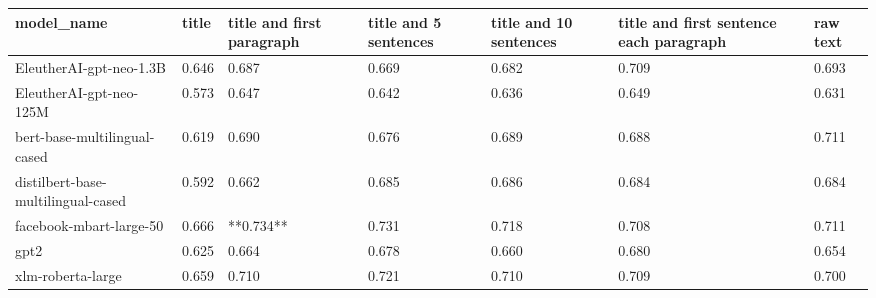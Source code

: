 \begin{tabular}{lllllll}
\toprule
                        model\_name & title & title and first paragraph & title and 5 sentences & title and 10 sentences & title and first sentence each paragraph & raw text \\
\midrule
           EleutherAI-gpt-neo-1.3B & 0.646 &                     0.687 &                 0.669 &                  0.682 &                                   0.709 &    0.693 \\
           EleutherAI-gpt-neo-125M & 0.573 &                     0.647 &                 0.642 &                  0.636 &                                   0.649 &    0.631 \\
      bert-base-multilingual-cased & 0.619 &                     0.690 &                 0.676 &                  0.689 &                                   0.688 &    0.711 \\
distilbert-base-multilingual-cased & 0.592 &                     0.662 &                 0.685 &                  0.686 &                                   0.684 &    0.684 \\
           facebook-mbart-large-50 & 0.666 &                 **0.734** &                 0.731 &                  0.718 &                                   0.708 &    0.711 \\
                              gpt2 & 0.625 &                     0.664 &                 0.678 &                  0.660 &                                   0.680 &    0.654 \\
                 xlm-roberta-large & 0.659 &                     0.710 &                 0.721 &                  0.710 &                                   0.709 &    0.700 \\
\bottomrule
\end{tabular}
